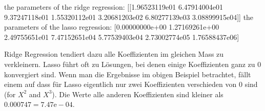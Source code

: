 \documentclass[letterpaper,10pt,english]{jupyterBook}
\begin{document}
\begin{sphinxVerbatim}[commandchars=\\\{\}]
\PYGZbs{}
      

\PYGZbs{}
      
\end{sphinxVerbatim}

\begin{sphinxVerbatim}[commandchars=\\\{\}]
the parameters of the ridge regression:
[[\PYGZhy{}1.96523119e\PYGZhy{}01 \PYGZhy{}6.47914004e\PYGZhy{}01 \PYGZhy{}9.37247118e\PYGZhy{}01  1.55320112e\PYGZhy{}01
   3.20681203e\PYGZhy{}02 \PYGZhy{}6.80277139e\PYGZhy{}03  3.08899915e\PYGZhy{}04]]
the parameters of the lasso regression:
[\PYGZhy{}0.00000000e+00 \PYGZhy{}1.27169261e+00  2.49755651e\PYGZhy{}01  7.47152651e\PYGZhy{}04
 \PYGZhy{}5.77539403e\PYGZhy{}04 \PYGZhy{}2.73002774e\PYGZhy{}05  1.76588437e\PYGZhy{}06]
\end{sphinxVerbatim}

\sphinxAtStartPar
Ridge Regression tendiert dazu alle Koeffizienten im gleichen Mass zu verkleinern. Lasso führt oft zu Lösungen, bei denen einige Koeffizienten ganz zu \(0\) konvergiert sind. Wenn man die Ergebnisse im obigen Beispiel betrachtet, fällt einem auf dass für Lasso eigentlich nur zwei Koeffizienten verschieden von \(0\) sind (for \(X^2\) and \(X^3\)).
Die Werte alle anderen Koeffizienten sind kleiner als \(0.000747 = 7.47\text{e}-04\).

\noindent{}
\end{document}
